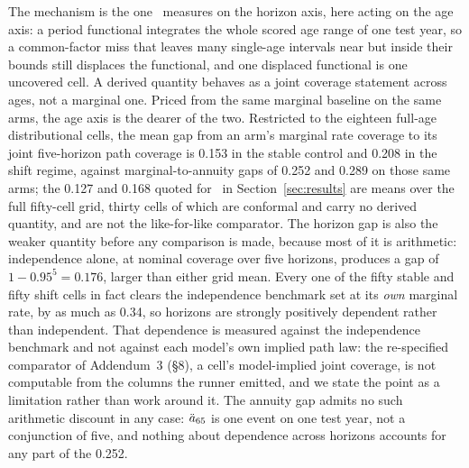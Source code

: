 The mechanism is the one \Hthree\ measures on the horizon axis, here acting
on the age axis: a period functional integrates the whole scored age range
of one test year, so a common-factor miss that leaves many single-age
intervals near but inside their bounds still displaces the functional, and
one displaced functional is one uncovered cell. A derived quantity behaves
as a joint coverage statement across ages, not a marginal one. Priced from
the same marginal baseline on the same arms, the age axis is the dearer of
the two. Restricted to the eighteen full-age distributional cells, the mean
gap from an arm's marginal rate coverage to its joint five-horizon path
coverage is 0.153 in the stable control and 0.208 in the shift regime,
against marginal-to-annuity gaps of 0.252 and 0.289 on those same arms; the
0.127 and 0.168 quoted for \Hthree\ in Section~\ref{sec:results} are means
over the full fifty-cell grid, thirty cells of which are conformal and
carry no derived quantity, and are not the like-for-like comparator. The
horizon gap is also the weaker quantity before any comparison is made,
because most of it is arithmetic: independence alone, at nominal coverage
over five horizons, produces a gap of $1-0.95^5=0.176$, larger than either
grid mean. Every one of the fifty stable and fifty shift cells in fact
clears the independence benchmark set at its \emph{own} marginal rate, by
as much as 0.34, so horizons are strongly positively dependent rather than
independent. That dependence is measured against the independence
benchmark and not against each model's own implied path law: the
re-specified comparator of Addendum~3 (\S8), a cell's model-implied joint
coverage, is not computable from the columns the runner emitted, and we
state the point as a limitation rather than work around it. The annuity gap
admits no such arithmetic discount in any case: $\ddot{a}_{65}$ is one event on
one test year, not a conjunction of five, and nothing about dependence
across horizons accounts for any part of the 0.252.

